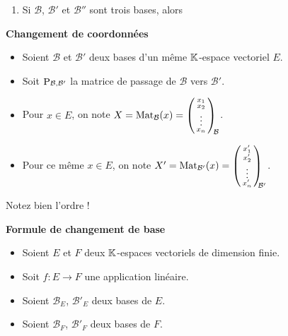 \documentclass[10pt,class=article,crop=false]{standalone}
\begin{document}
\begin{multicols}{2}
\begin{proposition}
\begin{enumerate}
		
		\item Si $\mathcal{B}$, $\mathcal{B}'$ et $\mathcal{B}''$ sont trois bases, alors
	\end{enumerate}
\end{proposition}


\textbf{Changement de coordonnées}


\begin{itemize}
	\item Soient $\mathcal{B}$ et
	$\mathcal{B}'$ deux bases d'un même $\mathbb{K}$-espace vectoriel $E$.
	
	\item Soit $\mathop{\mathrm{P}}\nolimits_{\mathcal{B},\mathcal{B}'}$ la matrice de passage de
	$\mathcal{B}$ vers $\mathcal{B}'$.
	
	\item Pour $x \in E$, on note $X = \operatorname{Mat}_\mathcal{B} (x) =
	\left(\begin{smallmatrix}x_1\cr x_2\cr \vdots \cr x_n
	\end{smallmatrix}\right)_{\!\!\mathcal{B}}$.
	
	\item Pour ce même $x \in E$, on note $X' = \operatorname{Mat}_{\mathcal{B}'} (x) =
	\left(\begin{smallmatrix}x'_1\cr x'_2\cr \vdots \cr x'_n
	\end{smallmatrix}\right)_{\!\!\!\mathcal{B}'}$.
\end{itemize}

\begin{proposition}
	\sauteligne
\end{proposition}
Notez bien l'ordre !


\textbf{Formule de changement de base}

\begin{itemize}
	\item Soient $E$ et $F$ deux $\mathbb{K}$-espaces vectoriels de dimension finie.
	
	\item Soit $f : E \to F$ une application linéaire.
	
	\item Soient $\mathcal{B}_E$, $\mathcal{B}'_E$ deux bases de $E$.
	
	\item Soient $\mathcal{B}_F$, $\mathcal{B}'_F$ deux bases de $F$.
	

\end{itemize}
\end{multicols}
\end{document}
